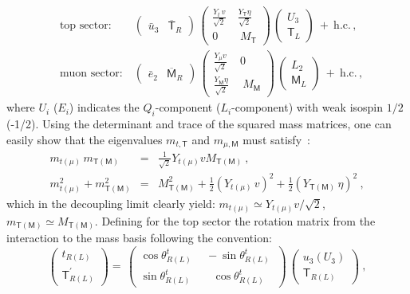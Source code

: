 \begin{eqnarray}
	\label{eq:Mixing_Partner}
	& \textrm{top sector:} & \ 
	\left(  \begin{array}{cc}
		\bar{u}_3 & \overline{\mathsf{T}}_R
	\end{array} \right) \, \begin{pmatrix}
		\frac{Y_t  \, v}{\sqrt{2}} \ &  \frac{Y_{\mathsf{T}} \eta}{\sqrt{2}} \ \\
		0 \ & \ M_\mathsf{T}
	\end{pmatrix} \,
	\left(  \begin{array}{c}
		U_3 \\  \mathsf{T}_L
	\end{array} \right) \ + \ \mathrm{h.c.} \, , \\
	& \textrm{muon sector:} & \ 
	\left(  \begin{array}{cc}
		\bar{e}_2 & \overline{\mathsf{M}}_{R}
	\end{array} \right) \, \begin{pmatrix}
		\frac{Y_\mu v}{\sqrt{2}} \ & 0\ \\
		\frac{Y_{\mathsf{M}} \eta }{ \sqrt{2}}  \ & \ M_\mathsf{M}
	\end{pmatrix} \,
	\left(  \begin{array}{c}
		L_{2} \\  \mathsf{M}_L
	\end{array} \right) \ + \ \mathrm{h.c.} \, , \nonumber
\end{eqnarray}
where $U_{i}$ ($E_{i}$) indicates the $Q_{i}$-component ($L_{i}$-component) with weak isospin $1/2$ (-1/2). Using the determinant and trace of the squared mass matrices, one can easily show that the eigenvalues $m_{t,\mathsf{T}}$ and $m_{\mu,\mathsf{M}}$ must satisfy~\cite{Kamenik:2017tnu}:
\begin{eqnarray}
	\label{eq:Mass_Eigenvalues}
	m_{t(\mu)} \,  m_{\mathsf{T(M)}} & = & \frac{1}{\sqrt{2}} Y_{t(\mu)} v M_{\mathsf{T(M)}} \ , \\ m_{t(\mu)}^2 + m_{\mathsf{T(M)}}^2 & = & 
	M_{\mathsf{T(M)}}^2 + \frac{1}{2} (Y_{t(\mu)} \, v)^2 + \frac{1}{2} (Y_{\mathsf{T(M)}} \, \eta)^2 \ , \nonumber
\end{eqnarray}
which in the decoupling limit clearly yield: $m_{t(\mu)} \simeq Y_{t(\mu)} v / \sqrt{2}$, $m_{\mathsf{T(M)}} \simeq M_{\mathsf{T(M)}}$.
Defining for the top sector the rotation matrix from the interaction to the mass basis following the convention:
\begin{equation}
	\label{eq:rot_phys_states} 
	\left(  \begin{array}{c}
		t_{R (L)} \\  \mathsf{T}^{\prime}_{R (L)}
	\end{array} \right) = \,
	\begin{pmatrix}
		\cos \theta^{t}_{R(L)} \ & \ - \sin \theta^{t}_{R(L)} \ \\
		\sin \theta^{t}_{R(L)}  \ & \ \ \ \, \cos \theta^{t}_{R(L)}
	\end{pmatrix} \,
	\left(  \begin{array}{c}
		u_{3} (U_{3}) \\  
		\mathsf{T}_{R (L)}
	\end{array} \right) \ ,
\end{equation}
